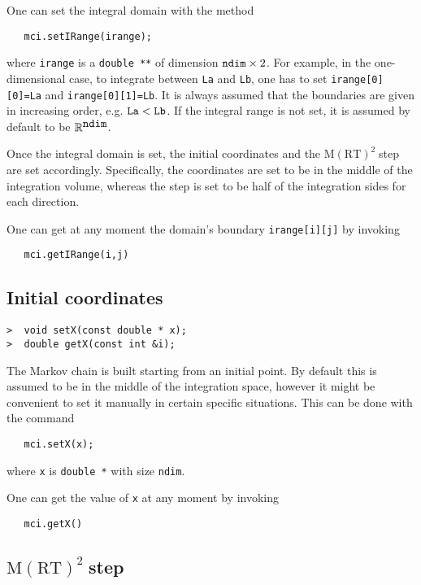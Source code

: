 \documentclass[11pt,a4paper,twoside]{article}
\newcommand{\MRTWO}{$ \text{M}(\text{RT})^2 \;$}
\begin{document}
One can set the integral domain with the method
\begin{verbatim}
   mci.setIRange(irange);
\end{verbatim}
where \verb+irange+ is a \verb+double **+ of dimension $\verb+ndim+ \times 2$.
For example, in the one-dimensional case, to integrate between \verb+La+ and \verb+Lb+, one has to set \verb+irange[0][0]=La+ and \verb+irange[0][1]=Lb+.
It is always assumed that the boundaries are given in increasing order, e.g. $\verb+La+ < \verb+Lb+$.
If the integral range is not set, it is assumed by default to be $\mathbb{R}^{\verb+ndim+}$.

Once the integral domain is set, the initial coordinates and the \MRTWO step are set accordingly.
Specifically, the coordinates are set to be in the middle of the integration volume, whereas the step is set to be half of the integration sides for each direction.

One can get at any moment the domain's boundary \verb+irange[i][j]+ by invoking
\begin{verbatim}
   mci.getIRange(i,j)
\end{verbatim}


\subsection{Initial coordinates} %
\label{sub:starting_coordinates}

\begin{verbatim}
>  void setX(const double * x);
>  double getX(const int &i);
\end{verbatim}

The Markov chain is built starting from an initial point.
By default this is assumed to be in the middle of the integration space, however it might be convenient to set it manually in certain specific situations.
This can be done with the command
\begin{verbatim}
   mci.setX(x);
\end{verbatim}
where \verb+x+ is \verb+double *+ with size \verb+ndim+.

One can get the value of \verb+x+ at any moment by invoking
\begin{verbatim}
   mci.getX()
\end{verbatim}


\subsection{\MRTWO step} %
\label{sub:mrt2_step}
\end{document}
